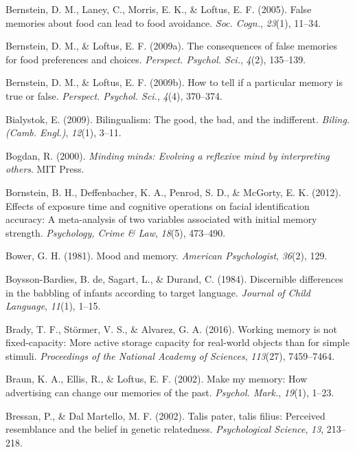 \documentclass[
]{krantz}
\newlength{\cslhangindent}
\newenvironment{CSLReferences}[2] %
 {\begin{list}{}{%
  \setlength{\itemindent}{0pt}
  \setlength{\leftmargin}{0pt}
  \setlength{\parsep}{0pt}
  \ifodd #1
   \setlength{\leftmargin}{\cslhangindent}
   \setlength{\itemindent}{-1\cslhangindent}
  \fi
  \setlength{\itemsep}{#2\baselineskip}}}
 {\end{list}}
\begin{document}
\begin{CSLReferences}{1}{0}
Bernstein, D. M., Laney, C., Morris, E. K., \& Loftus, E. F. (2005). False memories about food can lead to food avoidance. \emph{Soc. Cogn.}, \emph{23}(1), 11--34.

Bernstein, D. M., \& Loftus, E. F. (2009a). The consequences of false memories for food preferences and choices. \emph{Perspect. Psychol. Sci.}, \emph{4}(2), 135--139.

Bernstein, D. M., \& Loftus, E. F. (2009b). How to tell if a particular memory is true or false. \emph{Perspect. Psychol. Sci.}, \emph{4}(4), 370--374.

Bialystok, E. (2009). Bilingualism: The good, the bad, and the indifferent. \emph{Biling. (Camb. Engl.)}, \emph{12}(1), 3--11.

Bogdan, R. (2000). \emph{Minding minds: Evolving a reflexive mind by interpreting others}. MIT Press.

Bornstein, B. H., Deffenbacher, K. A., Penrod, S. D., \& McGorty, E. K. (2012). Effects of exposure time and cognitive operations on facial identification accuracy: A meta-analysis of two variables associated with initial memory strength. \emph{Psychology, Crime \& Law}, \emph{18}(5), 473--490.

Bower, G. H. (1981). Mood and memory. \emph{American Psychologist}, \emph{36}(2), 129.

Boysson-Bardies, B. de, Sagart, L., \& Durand, C. (1984). Discernible differences in the babbling of infants according to target language. \emph{Journal of Child Language}, \emph{11}(1), 1--15.

Brady, T. F., Störmer, V. S., \& Alvarez, G. A. (2016). Working memory is not fixed-capacity: More active storage capacity for real-world objects than for simple stimuli. \emph{Proceedings of the National Academy of Sciences}, \emph{113}(27), 7459--7464.

Braun, K. A., Ellis, R., \& Loftus, E. F. (2002). Make my memory: How advertising can change our memories of the past. \emph{Psychol. Mark.}, \emph{19}(1), 1--23.

Bressan, P., \& Dal Martello, M. F. (2002). Talis pater, talis filius: Perceived resemblance and the belief in genetic relatedness. \emph{Psychological Science}, \emph{13}, 213--218.


\end{CSLReferences}
\end{document}
